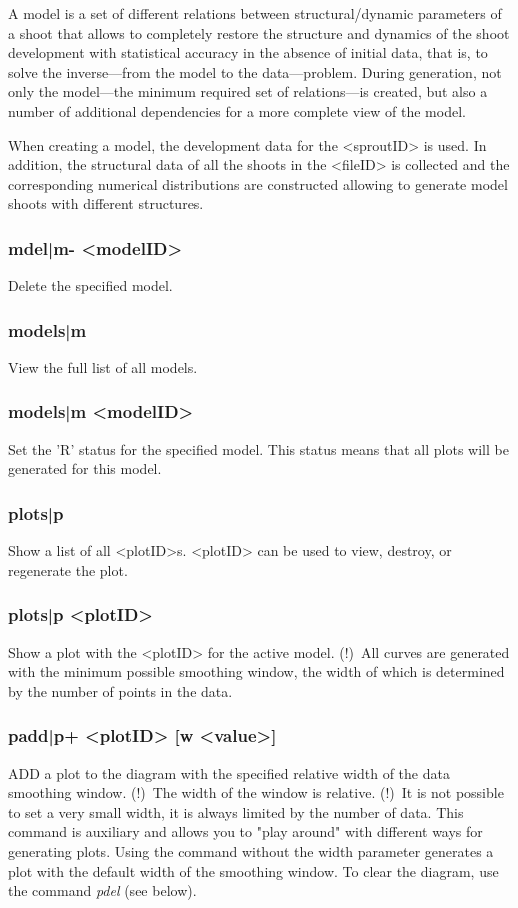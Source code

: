 \documentclass[a4paper]{article}
\begin{document}
A model is a set of different relations between structural/dynamic parameters of a shoot that allows to completely restore the structure and dynamics of the shoot development with statistical accuracy in the absence of initial data, that is, to solve the inverse---from the model to the data---problem. During generation, not only the model---the minimum required set of relations---is created, but also a number of additional dependencies for a more complete view of the model.

When creating a model, the development data for the <sproutID> is used. In addition, the structural data of all the shoots in the <fileID> is collected and the corresponding numerical distributions are constructed allowing to generate model shoots with different structures.

\subsubsection{mdel|m- <modelID>}
Delete the specified model.

\subsubsection{models|m}
View the full list of all models.

\subsubsection{models|m <modelID>}
Set the 'R' status for the specified model. This status means that all plots will be generated for this model.

\subsubsection{plots|p}
Show a list of all <plotID>s. <plotID> can be used to view, destroy, or regenerate the plot.

\subsubsection{plots|p <plotID>}
Show a plot with the <plotID> for the active model. (!)~All curves are generated with the minimum possible smoothing window, the width of which is determined by the number of points in the data.

\subsubsection{padd|p+ <plotID> [w <value>]}
ADD a plot to the diagram with the specified relative width of the data smoothing window. (!)~The width of the window is relative. (!)~It is not possible to set a very small width, it is always limited by the number of data. This command is auxiliary and allows you to "play around" with different ways for generating plots. Using the command without the width parameter generates a plot with the default width of the smoothing window. To clear the diagram, use the command \textit{pdel} (see below).
\end{document}
